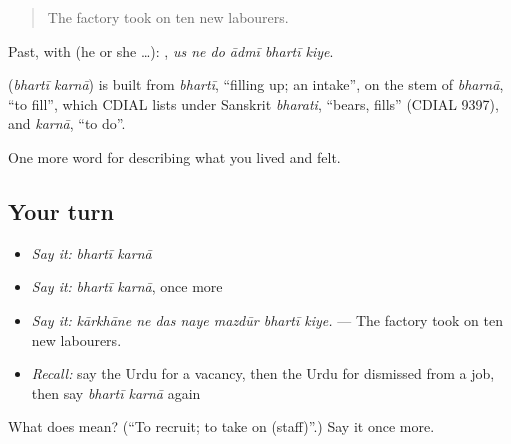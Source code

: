 \begin{quote}
The factory took on ten new labourers.
\end{quote}

Past, with  (he or she …):      , \emph{us ne do ādmī bhartī kiye}.

\begin{cousinweb}
\textbf{ } (\emph{bhartī karnā}) is built from \emph{bhartī}, \textquotedblleft{}filling up; an intake\textquotedblright{}, on the stem of \emph{bharnā}, \textquotedblleft{}to fill\textquotedblright{}, which CDIAL lists under Sanskrit \emph{bharati}, \textquotedblleft{}bears, fills\textquotedblright{} (CDIAL 9397), and \emph{karnā}, \textquotedblleft{}to do\textquotedblright{}.
\end{cousinweb}

\begin{grammarlens}[title={What you've built}]
One more word for describing what you lived and felt.
\end{grammarlens}

\subsection*{Your turn}
\begin{itemize}
\raggedright
  \item \emph{Say it:} \emph{bhartī karnā}
  \item \emph{Say it:} \emph{bhartī karnā}, once more
  \item \emph{Say it:} \emph{kārkhāne ne das naye mazdūr bhartī kiye.} — The factory took on ten new labourers.
  \item \emph{Recall:} say the Urdu for a vacancy, then the Urdu for dismissed from a job, then say \emph{bhartī karnā} again
\end{itemize}

\begin{tcolorbox}[breakable,colback=teal!4,colframe=teal!35!black,title={Before you move on}]
What does   mean? (\textquotedblleft{}To recruit; to take on (staff)\textquotedblright{}.) Say it once more.
\end{tcolorbox}
